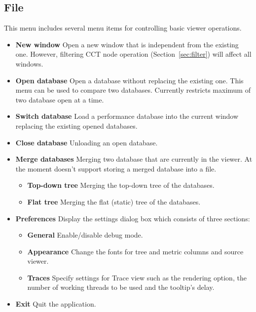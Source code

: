 \subsection{File}
This menu includes several menu items for controlling basic viewer operations.
\begin{itemize}
  \item \textbf{New window}
  Open a new \hpcviewer{} window that is independent from the existing one.
However, filtering CCT node operation (Section~\ref{sec:filter}) will affect all \hpcviewer{} windows.

  \item \textbf{Open database}
  Open a database without replacing the existing one. This menu can be used to compare two databases.
  Currently \hpcviewer{} restricts maximum of two database open at a time.

  \item \textbf{Switch database}
  Load a performance database into the current \hpcviewer{} window replacing the existing opened databases.

  \item \textbf{Close database}
  Unloading an open database.

  \item \textbf{Merge databases}
  Merging two database that are currently in the viewer.
  At the moment \hpcviewer{} doesn't support storing a merged database into a file.
  \begin{itemize}
    \item \textbf{Top-down tree} Merging the top-down tree of the databases.
    \item \textbf{Flat tree}     Merging the flat (static) tree of the databases.
  \end{itemize}

  \item \textbf{Preferences}
  Display the settings dialog box which consists of three sections:
  \begin{itemize}
     \item \textbf{General} Enable/disable debug mode.
     \item \textbf{Appearance} Change the fonts for tree and metric columns and source viewer.
     \item \textbf{Traces} Specify settings for Trace view such as the rendering option, the number of working threads to be used and the tooltip's delay.
  \end{itemize}


  \item \textbf{Exit}
  Quit the \hpcviewer{} application.

\end{itemize}


